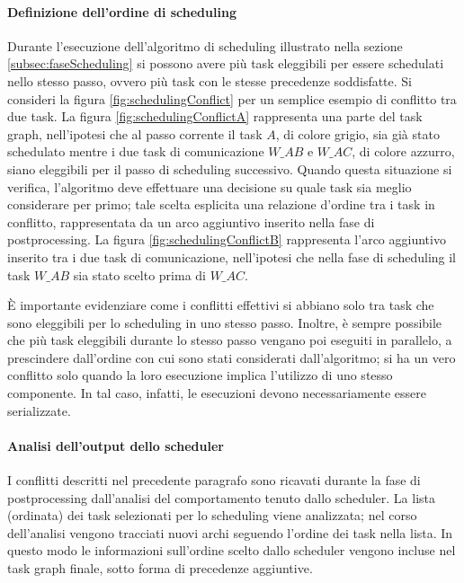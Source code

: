 \paragraph{Definizione dell'ordine di scheduling}
Durante l'esecuzione dell'algoritmo di scheduling illustrato nella sezione 
\ref{subsec:faseScheduling} si possono avere più task eleggibili per essere 
schedulati nello stesso passo, ovvero più task con le stesse precedenze 
soddisfatte. Si consideri la figura \ref{fig:schedulingConflict} per un 
semplice esempio di conflitto tra due task. La figura 
\ref{fig:schedulingConflictA} rappresenta una parte del task graph, 
nell'ipotesi che al passo corrente il task $A$, di colore grigio, sia già stato 
schedulato mentre i due task di comunicazione $W\_AB$ e $W\_AC$, di colore 
azzurro, siano eleggibili per il passo di scheduling successivo. Quando questa
situazione si verifica, l'algoritmo deve effettuare una decisione su quale 
task sia meglio considerare per primo; tale scelta esplicita una relazione 
d'ordine tra i task in conflitto, rappresentata da un arco aggiuntivo inserito 
nella fase di postprocessing. La figura \ref{fig:schedulingConflictB} 
rappresenta l'arco aggiuntivo inserito tra i due task di comunicazione, 
nell'ipotesi che nella fase di scheduling il task $W\_AB$ sia stato scelto
prima di $W\_AC$.

È importante evidenziare come i conflitti effettivi si abbiano solo tra task 
che sono eleggibili per lo scheduling in uno stesso passo. Inoltre, è sempre possibile 
che più task eleggibili durante lo stesso passo vengano poi eseguiti in 
parallelo, a prescindere dall'ordine con cui sono stati considerati 
dall'algoritmo; si ha un vero conflitto solo quando la loro esecuzione implica 
l'utilizzo di uno stesso componente. In tal caso, infatti, le esecuzioni devono 
necessariamente essere serializzate.

\paragraph{Analisi dell'output dello scheduler}
I conflitti descritti nel precedente paragrafo sono ricavati durante la fase di
postprocessing dall'analisi del comportamento tenuto dallo scheduler.
La lista (ordinata) dei task selezionati per lo scheduling viene analizzata; nel
corso dell'analisi vengono tracciati nuovi archi seguendo l'ordine dei task nella
lista. In questo modo le informazioni sull'ordine scelto dallo scheduler vengono
incluse nel task graph finale, sotto forma di precedenze aggiuntive.

